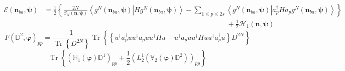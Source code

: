 \documentclass[aps,preprint]{revtex4}%
\begin{document}
\begin{align}
\mathcal{E}\left(  \mathbf{n}_{ba},\mathbf{\psi}\right)   &  =\frac{1}%
{2}\left\{  \frac{2N}{S_{N}\left(  \mathbf{n},\mathbf{\psi}\right)
}\left\langle \left.  g^{N}\left(  \mathbf{n}_{ba},\mathbf{\psi}\right)
\right\vert Hg^{N}\left(  \mathbf{n}_{ba},\mathbf{\psi}\right)  \right\rangle
-%
{\textstyle\sum\limits_{1\leq p\leq2s}}
\left\langle \left.  g^{N}\left(  \mathbf{n}_{ba},\mathbf{\psi}\right)
\right\vert a_{p}^{\dagger}Ha_{p}g^{N}\left(  \mathbf{n}_{ba},\mathbf{\psi
}\right)  \right\rangle \right\} \\
&  \qquad\qquad\qquad\qquad\qquad\qquad\qquad\qquad\qquad\qquad\qquad
\qquad\qquad+\frac{1}{2}\mathcal{H}_{1}\left(  \mathbf{n},\mathbf{\psi
}\right)
\end{align}%
\begin{equation}
F\left(  \mathbb{D}^{2},\mathbf{\varphi}\right)  _{pp}=\frac{1}%
{\operatorname{Tr}\left\{  D^{2N}\right\}  }\operatorname{Tr}\left\{
\overset{}{\left\{  u^{\dagger}a_{p}^{\dagger}uu^{\dagger}a_{p}uu^{\dagger
}Hu-u^{\dagger}a_{p}uu^{\dagger}Huu^{\dagger}a_{p}^{\dagger}u\right\}  }%
D^{2N}\right\}
\end{equation}%
\begin{equation}
\operatorname{Tr}\left\{  \left(  \mathbb{H}_{1}\left(  \mathbf{\varphi
}\right)  \mathbb{D}^{1}\right)  _{pp}+\frac{1}{2}\left(  L_{2}^{1}\left(
\mathbb{V}_{2}\left(  \mathbf{\varphi}\right)  \mathbb{D}^{2}\right)  \right)
_{pp}\right\}
\end{equation}
\end{document}
